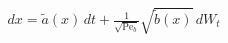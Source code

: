 \documentclass[preview]{standalone}
\begin{document}
\begin{align*}
dx=\widetilde a(x)\,dt+\frac{1}{\sqrt{\mathrm{Pe}_b}}\sqrt{\widetilde b(x)}\,dW_t
\end{align*}
\end{document}
